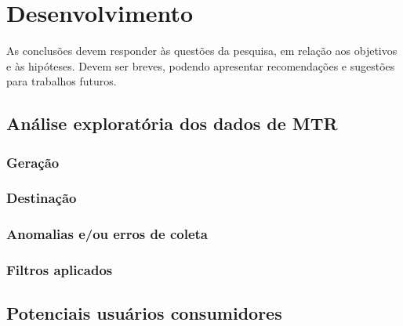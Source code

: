 \chapter{Desenvolvimento}

As conclusões devem responder às questões da pesquisa, em relação aos objetivos e às hipóteses. Devem ser breves, podendo apresentar recomendações e sugestões para trabalhos futuros.

\section{Análise exploratória dos dados de MTR}

\subsection{Geração}

\subsection{Destinação}

\subsection{Anomalias e/ou erros de coleta}

\subsection{Filtros aplicados}

\section{Potenciais usuários consumidores}

